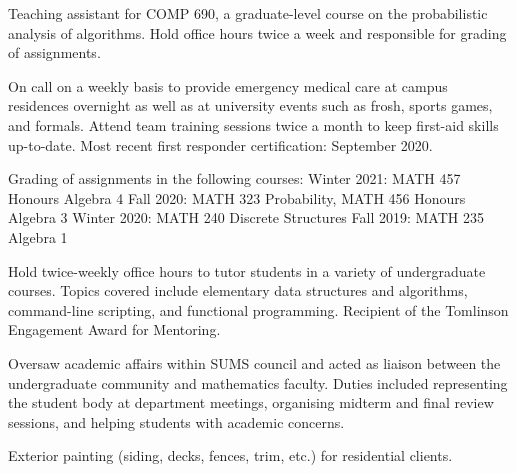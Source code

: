 \smallskip
Teaching assistant for COMP 690, a graduate-level course on the probabilistic analysis of algorithms.
Hold office hours twice a week and responsible for grading of assignments.
\medbreak

\smallskip
On call on a weekly basis to provide emergency medical care at campus residences overnight as well as at
university events such as frosh, sports games, and formals. Attend team training sessions twice a month to keep
first-aid skills up-to-date. Most recent first responder certification: September 2020.
\medbreak

\smallskip
Grading of assignments in the following courses:
\begingroup\parindent=10pt
\smallskip
\thing Winter 2021: MATH 457 Honours Algebra 4
\smallskip
\thing Fall 2020: MATH 323 Probability, MATH 456 Honours Algebra 3
\smallskip
\thing Winter 2020: MATH 240 Discrete Structures
\smallskip
\thing Fall 2019: MATH 235 Algebra 1
\endgroup
\medbreak

\smallskip
Hold twice-weekly office hours to tutor students in a variety of undergraduate courses.
Topics covered include elementary data structures and algorithms, command-line scripting,
and functional programming. Recipient of the Tomlinson Engagement Award for Mentoring.
\medbreak

\smallskip
Oversaw academic affairs within SUMS council and acted as liaison between the undergraduate community and
mathematics faculty. Duties included representing the student body at department meetings,
organising midterm and final review sessions,
and helping students with
academic concerns.
\medbreak

\smallskip
Exterior painting (siding, decks, fences, trim, etc.) for residential clients.
\medbreak

